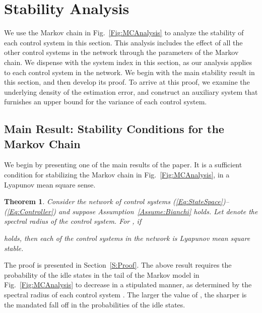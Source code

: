 \documentclass[twocolumn]{autart}
\newtheorem{theorem}{Theorem}[section]
\begin{document}
\section{Stability Analysis} \label{S:Results}

We use the Markov chain in Fig.~\ref{Fig:MCAnalysis} to analyze the stability of each control system in this section. This analysis includes the effect of all the other control systems in the network through the parameters of the Markov chain. We dispense with the system index  in this section, as our analysis applies to each control system in the network. We begin with the main stability result in this section, and then develop its proof. To arrive at this proof, we examine the underlying density of the estimation error, and construct an auxiliary system that furnishes an upper bound for the variance of each control system.

\subsection{Main Result: Stability Conditions for the Markov Chain}
We begin by presenting one of the main results of the paper. It is a sufficient condition for stabilizing the Markov chain in Fig.~\ref{Fig:MCAnalysis}, in a Lyapunov mean square sense.

\begin{theorem} \label{Thm:SuffGeoSeries}
Consider the network of control systems (\ref{Eq:StateSpace})--(\ref{Eq:Controller}) and suppose Assumption~\ref{Assume:Bianchi} holds. Let  denote the spectral radius of the  control system. For , if

holds, then each of the control systems in the network is Lyapunov mean square stable.
\end{theorem}

The proof is presented in Section~\ref{S:Proof}. The above result requires the probability of the idle states in the tail of the Markov model in Fig.~\ref{Fig:MCAnalysis} to decrease in a stipulated manner, as determined by the spectral radius of each control system . The larger the value of , the sharper is the mandated fall off in the probabilities of the idle states.
\end{document}
